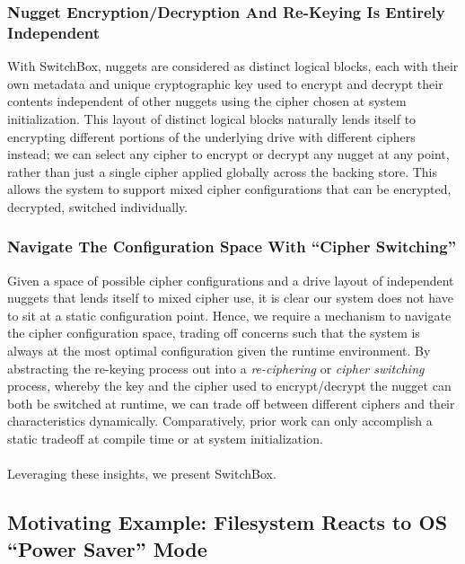 \subsubsection{Nugget Encryption/Decryption And Re-Keying Is Entirely Independent}

With SwitchBox, nuggets are considered as distinct logical blocks, each with
their own metadata and unique cryptographic key used to encrypt and decrypt
their contents independent of other nuggets using the cipher chosen at system
initialization. This layout of distinct logical blocks naturally lends itself to
encrypting different portions of the underlying drive with different ciphers
instead; we can select any cipher to encrypt or decrypt any nugget at any point,
rather than just a single cipher applied globally across the backing store. This
allows the system to support mixed cipher configurations that can be encrypted,
decrypted, switched individually.

\subsubsection{Navigate The Configuration Space With ``Cipher Switching''}

Given a space of possible cipher configurations and a drive layout of
independent nuggets that lends itself to mixed cipher use, it is clear our
system does not have to sit at a static configuration point. Hence, we require a
mechanism to navigate the cipher configuration space, trading off concerns such
that the system is always at the most optimal configuration given the runtime
environment. By abstracting the re-keying process out into a \emph{re-ciphering}
or \emph{cipher switching} process, whereby the key and the cipher used to
encrypt/decrypt the nugget can both be switched at runtime, we can trade off
between different ciphers and their characteristics dynamically. Comparatively,
prior work can only accomplish a static tradeoff at compile time or at system
initialization. \\
\\
Leveraging these insights, we present SwitchBox. 

\subsection{Motivating Example: Filesystem Reacts to OS ``Power Saver'' Mode}

